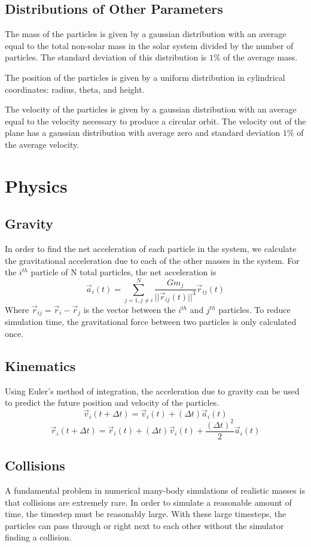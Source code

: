 \documentclass{article}
\begin{document}
\subsection{Distributions of Other Parameters}
The mass of the particles is given by a gaussian distribution with an average equal to the total non-solar mass in the solar system divided by the number of particles. The standard deviation of this distribution is $1\%$ of the average mass.

The position of the particles is given by a uniform distribution in cylindrical coordinates: radius, theta, and height.

The velocity of the particles is given by a gaussian distribution with an average equal to the velocity necessary to produce a circular orbit. The velocity out of the plane has a gaussian distribution with average zero and standard deviation $1\%$ of the average velocity.

\section{Physics}
\subsection{Gravity}
In order to find the net acceleration of each particle in the system, we calculate the gravitational acceleration due to each of the other masses in the system. For the $i^{th}$ particle of N total particles, the net acceleration is
\[\vec{a}_i(t) = \sum_{j=1, j\neq i}^{N} \frac{Gm_j}{||\vec{r}_{ij}(t)||^3} \vec{r}_{ij}(t)\]
Where $\vec{r}_{ij} = \vec{r}_i - \vec{r}_j$ is the vector between the $i^{th}$ and $j^{th}$ particles. To reduce simulation time, the gravitational force between two particles is only calculated once.

\subsection{Kinematics}
Using Euler's method of integration, the acceleration due to gravity can be used to predict the future position and velocity of the particles.
\[\vec{v}_i(t + \Delta t) = \vec{v}_i(t) + (\Delta t) \vec{a}_i(t)\]
\[\vec{r}_i(t + \Delta t) = \vec{r}_i(t) + (\Delta t) \vec{v}_i(t) + \frac{(\Delta t)^2}{2} \vec{a}_i(t)\]

\subsection{Collisions}
A fundamental problem in numerical many-body simulations of realistic masses is that collisions are extremely rare. In order to simulate a reasonable amount of time, the timestep must be reasonably large. With these large timesteps, the particles can pass through or right next to each other without the simulator finding a collision.
\end{document}
